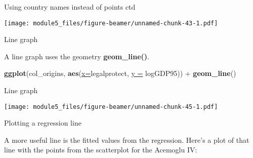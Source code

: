 \documentclass[ignorenonframetext,]{beamer}
\newenvironment{Shaded}{\begin{snugshade}}{\end{snugshade}}
\newcommand{\KeywordTok}[1]{\textcolor[rgb]{0.26,0.66,0.93}{\textbf{#1}}}
\newcommand{\DataTypeTok}[1]{\textcolor[rgb]{0.74,0.68,0.62}{\underline{#1}}}
\newcommand{\StringTok}[1]{\textcolor[rgb]{0.02,0.61,0.04}{#1}}
\newcommand{\OperatorTok}[1]{\textcolor[rgb]{0.74,0.68,0.62}{#1}}
\newcommand{\NormalTok}[1]{\textcolor[rgb]{0.74,0.68,0.62}{#1}}
\begin{document}
\begin{frame}{Using country names instead of points ctd}

\texttt{[image: module5\_files/figure-beamer/unnamed-chunk-43-1.pdf]}

\end{frame}

\begin{frame}[fragile]{Line graph}

A line graph uses the geometry \textbf{geom\_line()}.

\begin{Shaded}
\begin{Highlighting}[]
\KeywordTok{ggplot}\NormalTok{(col_origins, }\KeywordTok{aes}\NormalTok{(}\DataTypeTok{x=}\NormalTok{legalprotect, }
            \DataTypeTok{y =}\NormalTok{ logGDP95)) }\OperatorTok{+}\StringTok{ }\KeywordTok{geom_line}\NormalTok{()}
\end{Highlighting}
\end{Shaded}

\end{frame}

\begin{frame}{Line graph}

\texttt{[image: module5\_files/figure-beamer/unnamed-chunk-45-1.pdf]}

\end{frame}

\begin{frame}[fragile]{Plotting a regression line}

A more useful line is the fitted values from the regression. Here's a
plot of that line with the points from the scatterplot for the Acemoglu
IV:

\begin{Shaded}
\end{Shaded}

\end{frame}
\end{document}
